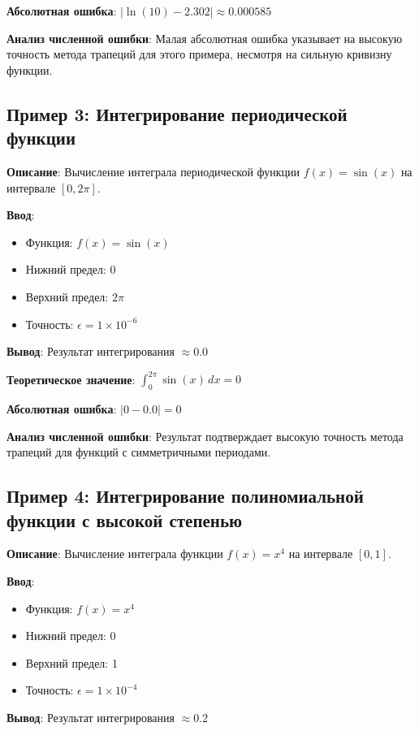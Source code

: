 \textbf{Абсолютная ошибка}: \(|\ln(10) - 2.302| \approx 0.000585\)

\textbf{Анализ численной ошибки}: Малая абсолютная ошибка указывает на высокую точность метода трапеций для этого примера, несмотря на сильную кривизну функции.

\subsection{Пример 3: Интегрирование периодической функции}

\textbf{Описание}: Вычисление интеграла периодической функции \(f(x) = \sin(x)\) на интервале \([0, 2\pi]\).

\textbf{Ввод}:
\begin{itemize}
    \item Функция: \(f(x) = \sin(x)\)
    \item Нижний предел: 0
    \item Верхний предел: \(2\pi\)
    \item Точность: \(\epsilon = 1 \times 10^{-6}\)
\end{itemize}

\textbf{Вывод}: Результат интегрирования \(\approx 0.0\)

\textbf{Теоретическое значение}: \(\int_0^{2\pi} \sin(x) \, dx = 0\)

\textbf{Абсолютная ошибка}: \(|0 - 0.0| = 0\)

\textbf{Анализ численной ошибки}: Результат подтверждает высокую точность метода трапеций для функций с симметричными периодами.

\subsection{Пример 4: Интегрирование полиномиальной функции с высокой степенью}

\textbf{Описание}: Вычисление интеграла функции \(f(x) = x^4\) на интервале \([0, 1]\).

\textbf{Ввод}:
\begin{itemize}
    \item Функция: \(f(x) = x^4\)
    \item Нижний предел: 0
    \item Верхний предел: 1
    \item Точность: \(\epsilon = 1 \times 10^{-4}\)
\end{itemize}

\textbf{Вывод}: Результат интегрирования \(\approx 0.2\)

